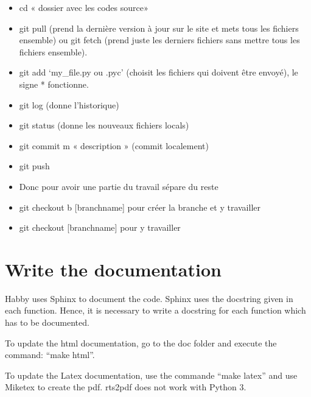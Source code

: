 \documentclass[letterpaper,10pt,english]{sphinxmanual}
\begin{document}
\begin{itemize}
\item {} 
cd « dossier avec les codes source»

\item {} 
git pull (prend la dernière version à jour sur le site et mets tous les fichiers ensemble) ou git fetch (prend juste les derniers fichiers sans mettre tous les fichiers ensemble).

\item {} 
git add ‘my\_file.py ou .pyc’ (choisit les fichiers qui doivent être envoyé), le signe * fonctionne.

\item {} 
git log (donne l’historique)

\item {} 
git status (donne les nouveaux fichiers locals)

\item {} 
git commit \textendash{}m « description » (commit localement)

\item {} 
git push

\end{itemize}

\begin{itemize}
\item {} 
Donc pour avoir une partie du travail sépare du reste

\item {} 
git checkout \textendash{}b {[}branchname{]} pour créer la branche et y travailler

\item {} 
git checkout {[}branchname{]} pour y travailler

\end{itemize}


\section{Write the documentation}
\label{\detokenize{index:write-the-documentation}}
Habby uses Sphinx to document the code. Sphinx uses the docstring given in each function. Hence, it is necessary to write a docstring for each function which has to be documented.

To update the html documentation, go to the doc folder and execute the command: “make html”.

To update the Latex documentation, use the commande ``make latex'' and use Miketex to create the pdf. rts2pdf does not work with Python 3.
\end{document}
